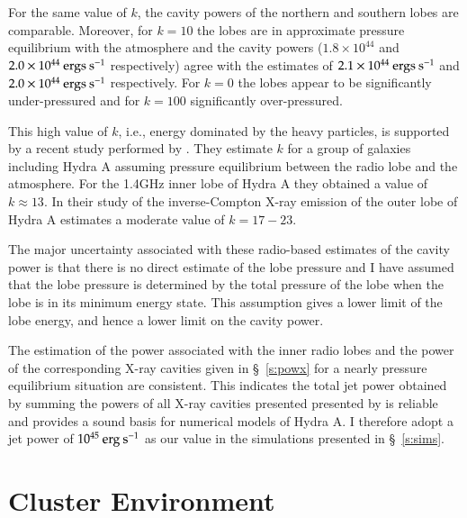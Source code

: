 For the same value of $k$, the cavity powers of the northern and southern lobes are comparable. Moreover, for $k=10$ the lobes are in approximate pressure equilibrium with the atmosphere and the cavity powers ($1.8 \times 10^{44}$ and $2.0\times 10^{44} \> \rm ergs \> s^{-1}$ respectively) agree with the \citet{wise07} estimates of $2.1\times 10^{44} \> \rm ergs \> s^{-1}$ and $2.0\times 10^{44} \> \rm ergs \> s^{-1}$ respectively. For $k=0$ the lobes appear to be significantly under-pressured and for $k=100$ significantly over-pressured.

This high value of $k$, i.e., energy dominated by the heavy particles, is  supported by a recent study performed by \citep{birzan08}. They estimate $k$ for a group of galaxies including Hydra A assuming pressure equilibrium between the radio lobe and the atmosphere. For the 1.4GHz inner lobe of Hydra A they obtained a value of $k\approx13$. In their study of the inverse-Compton X-ray emission of the outer lobe of Hydra A \citet{hardcastle10} estimates a moderate value of $k=17 - 23$. 

The major uncertainty associated with these radio-based estimates of the cavity power is that there is no direct estimate of the lobe pressure and I have assumed that the lobe pressure is determined by the total pressure of the lobe when the lobe is in its minimum energy state. This assumption gives a lower limit of the lobe energy, and hence a lower limit on the cavity power.


The estimation of the power associated with the inner radio lobes and the power of the corresponding X-ray cavities given in \S~\ref{s:powx} for a nearly pressure equilibrium situation are consistent. This indicates the total jet power obtained by summing the powers of all X-ray cavities presented presented by \citet{wise07} is reliable and provides a sound basis for numerical models of Hydra A.  
I therefore adopt a jet power of $10^{45} \> \rm erg \> s^{-1}$ as our value in the simulations presented in \S~\ref{s:sims}. 


%
%
\section{Cluster Environment} \label{s:cluster}
 

